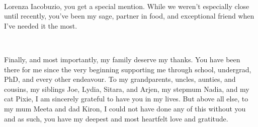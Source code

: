 \begin{SingleSpace}
\

Lorenza Iacobuzio, you get a special mention. While we weren't especially close until recently, you've been my sage, partner in food, and exceptional friend when I've needed it the most.

\

Finally, and most importantly, my family deserve my thanks. You have been there for me since the very beginning supporting me through school, undergrad, PhD, and every other endeavour. To my grandparents, uncles, aunties, and cousins, my siblings Joe, Lydia, Sitara, and Arjen, my stepmum Nadia, and my cat Pixie, I am sincerely grateful to have you in my lives. But above all else, to my mum Meeta and dad Kiron, I could not have done any of this without you and as such, you have my deepest and most heartfelt love and gratitude.

\end{SingleSpace}
\clearpage
